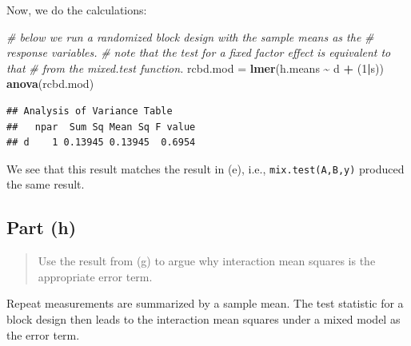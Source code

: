 \documentclass[
]{article}
\newenvironment{Shaded}{\begin{snugshade}}{\end{snugshade}}
\newcommand{\CommentTok}[1]{\textcolor[rgb]{0.56,0.35,0.01}{\textit{#1}}}
\newcommand{\DecValTok}[1]{\textcolor[rgb]{0.00,0.00,0.81}{#1}}
\newcommand{\FunctionTok}[1]{\textcolor[rgb]{0.13,0.29,0.53}{\textbf{#1}}}
\newcommand{\NormalTok}[1]{#1}
\newcommand{\OtherTok}[1]{\textcolor[rgb]{0.56,0.35,0.01}{#1}}
\newcommand{\SpecialCharTok}[1]{\textcolor[rgb]{0.81,0.36,0.00}{\textbf{#1}}}
\begin{document}
\begin{Shaded}
\end{Shaded}

Now, we do the calculations:

\begin{Shaded}
\begin{Highlighting}[]
\CommentTok{\# below we run a randomized block design with the sample means as the}
\CommentTok{\# response variables.}
\CommentTok{\# note that the test for a fixed factor effect is equivalent to that}
\CommentTok{\# from the mixed.test function.}
\NormalTok{rcbd.mod }\OtherTok{=} \FunctionTok{lmer}\NormalTok{(h.means }\SpecialCharTok{\textasciitilde{}}\NormalTok{ d }\SpecialCharTok{+}\NormalTok{ (}\DecValTok{1}\SpecialCharTok{|}\NormalTok{s))}
\FunctionTok{anova}\NormalTok{(rcbd.mod)}
\end{Highlighting}
\end{Shaded}

\begin{verbatim}
## Analysis of Variance Table
##   npar  Sum Sq Mean Sq F value
## d    1 0.13945 0.13945  0.6954
\end{verbatim}

We see that this result matches the result in (e), i.e.,
\texttt{mix.test(A,B,y)} produced the same result.

\hypertarget{part-h}{%
\subsection{Part (h)}\label{part-h}}

\begin{quote}
Use the result from (g) to argue why interaction mean squares is the
appropriate error term.
\end{quote}

Repeat measurements are summarized by a sample mean. The test statistic
for a block design then leads to the interaction mean squares under a
mixed model as the error term.
\end{document}
